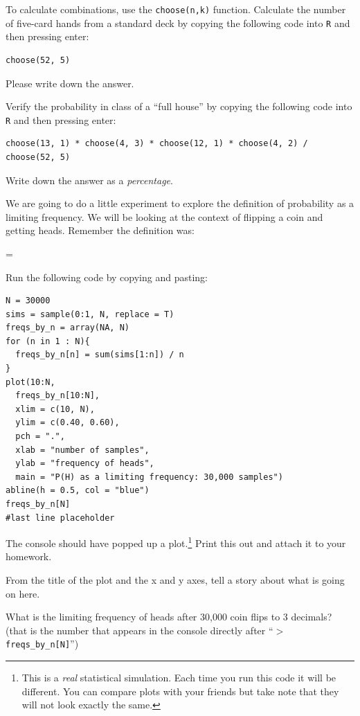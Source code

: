\documentclass[12pt]{article}
\begin{document}
\begin{enumerate}
\easysubproblem To calculate combinations, use the \texttt{choose(n,k)} function. Calculate the number of five-card hands from a standard deck by copying the following code into \texttt{R} and then pressing enter:

\begin{verbatim}
choose(52, 5)
\end{verbatim}

Please write down the answer.

\easysubproblem Verify the probability in class of a ``full house'' by copying the following code into \texttt{R} and then pressing enter:

\begin{verbatim}
choose(13, 1) * choose(4, 3) * choose(12, 1) * choose(4, 2) / choose(52, 5)
\end{verbatim}

Write down the answer as a \textit{percentage}.

\intermediatesubproblem We are going to do a little experiment to explore the definition of probability as a limiting frequency. We will be looking at the context of flipping a coin and getting heads. Remember the definition was:

\beqn
{} = \limitn {}
\eeqn

Run the following code by copying and pasting:

\begin{verbatim}
N = 30000
sims = sample(0:1, N, replace = T)
freqs_by_n = array(NA, N)
for (n in 1 : N){
  freqs_by_n[n] = sum(sims[1:n]) / n
}
plot(10:N, 
  freqs_by_n[10:N], 
  xlim = c(10, N), 
  ylim = c(0.40, 0.60), 
  pch = ".", 
  xlab = "number of samples",
  ylab = "frequency of heads",
  main = "P(H) as a limiting frequency: 30,000 samples")
abline(h = 0.5, col = "blue")
freqs_by_n[N]
#last line placeholder
\end{verbatim}

The console should have popped up a plot.\footnote{This is a \textit{real} statistical simulation. Each time you run this code it will be different. You can compare plots with your friends but take note that they will not look exactly the same.} Print this out and attach it to your homework. 

From the title of the plot and the x and y axes, tell a story about what is going on here. 

What is the limiting frequency of heads after 30,000 coin flips to 3 decimals? (that is the number that appears in the console directly after ``\texttt{$>$ freqs\_by\_n[N]}'')

\end{enumerate}
\end{document}
